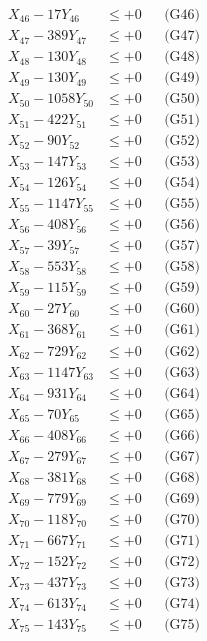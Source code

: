 \documentclass[a4paper,10pt]{article}
\begin{document}
{\begin{align}
X_{46} - 17Y_{46} &\leq +0 && \text{(G46)} \\
X_{47} - 389Y_{47} &\leq +0 && \text{(G47)} \\
X_{48} - 130Y_{48} &\leq +0 && \text{(G48)} \\
X_{49} - 130Y_{49} &\leq +0 && \text{(G49)} \\
X_{50} - 1058Y_{50} &\leq +0 && \text{(G50)} \\
\allowbreak
X_{51} - 422Y_{51} &\leq +0 && \text{(G51)} \\
X_{52} - 90Y_{52} &\leq +0 && \text{(G52)} \\
X_{53} - 147Y_{53} &\leq +0 && \text{(G53)} \\
X_{54} - 126Y_{54} &\leq +0 && \text{(G54)} \\
X_{55} - 1147Y_{55} &\leq +0 && \text{(G55)} \\
X_{56} - 408Y_{56} &\leq +0 && \text{(G56)} \\
X_{57} - 39Y_{57} &\leq +0 && \text{(G57)} \\
X_{58} - 553Y_{58} &\leq +0 && \text{(G58)} \\
X_{59} - 115Y_{59} &\leq +0 && \text{(G59)} \\
X_{60} - 27Y_{60} &\leq +0 && \text{(G60)} \\
\allowbreak
X_{61} - 368Y_{61} &\leq +0 && \text{(G61)} \\
X_{62} - 729Y_{62} &\leq +0 && \text{(G62)} \\
X_{63} - 1147Y_{63} &\leq +0 && \text{(G63)} \\
X_{64} - 931Y_{64} &\leq +0 && \text{(G64)} \\
X_{65} - 70Y_{65} &\leq +0 && \text{(G65)} \\
X_{66} - 408Y_{66} &\leq +0 && \text{(G66)} \\
X_{67} - 279Y_{67} &\leq +0 && \text{(G67)} \\
X_{68} - 381Y_{68} &\leq +0 && \text{(G68)} \\
X_{69} - 779Y_{69} &\leq +0 && \text{(G69)} \\
X_{70} - 118Y_{70} &\leq +0 && \text{(G70)} \\
\allowbreak
X_{71} - 667Y_{71} &\leq +0 && \text{(G71)} \\
X_{72} - 152Y_{72} &\leq +0 && \text{(G72)} \\
X_{73} - 437Y_{73} &\leq +0 && \text{(G73)} \\
X_{74} - 613Y_{74} &\leq +0 && \text{(G74)} \\
X_{75} - 143Y_{75} &\leq +0 && \text{(G75)} \\

\end{align}}
\end{document}
